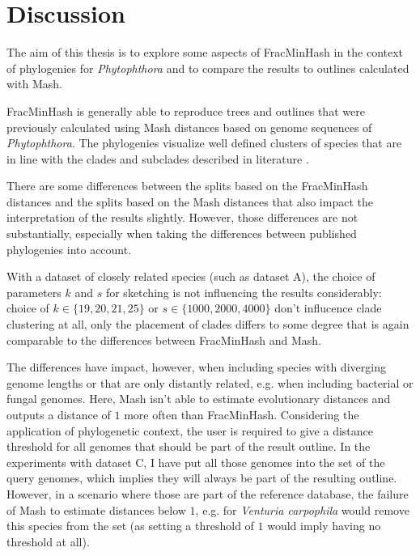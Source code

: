
\chapter{Discussion}
  \label{sec:diss}

The aim of this thesis is to explore some aspects of FracMinHash in the context
of phylogenies for \textit{Phytophthora} and to compare the results to
outlines calculated with Mash.

FracMinHash is generally able to reproduce trees and outlines that were
previously calculated using Mash distances based on genome sequences of
\textit{Phytophthora}. The phylogenies visualize well defined clusters of
species that are in line with the clades and subclades described in literature
\cite{abadPhytophthoraTaxonomicPhylogenetic2023a,yangExpandedPhylogenyGenus2017}.

There are some differences between the splits based on the FracMinHash distances
and the splits based on the Mash distances that also impact the interpretation
of the results slightly. However, those differences are not substantially,
especially when taking the differences between published phylogenies into
account.

With a dataset of closely related species (such as dataset A), the choice of
parameters $k$ and $s$ for sketching is not influencing the results
considerably: choice of $k \in \{19, 20, 21, 25\}$ or $s \in \{1000, 2000,
4000\}$ don't influcence clade clustering at all, only the placement of clades
differs to some degree that is again comparable to the differences between
FracMinHash and Mash.

The differences have impact, however, when including species with diverging
genome lengths or that are only distantly related, e.g. when including bacterial
or fungal genomes. Here, Mash isn't able to estimate evolutionary distances and
outputs a distance of $1$ more often than FracMinHash. Considering the
application of phylogenetic context, the user is required to give a distance
threshold for all genomes that should be part of the result outline. In the
experiments with dataset C, I have put all those genomes into the set of the
query genomes, which implies they will always be part of the resulting outline.
However, in a scenario where those are part of the reference database, the
failure of Mash to estimate distances below $1$, e.g. for \textit{Venturia
carpophila} would remove this species from the set (as setting a threshold of
$1$ would imply having no threshold at all).

